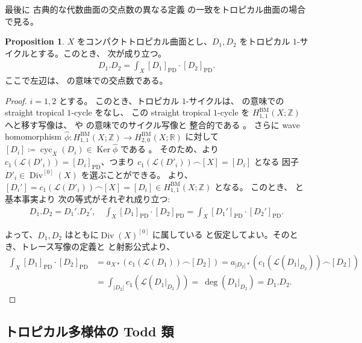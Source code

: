 \documentclass[a4paper,dvipdfmx,reqno,12pt]{amsart}
\theoremstyle{definition}
\newtheorem{proposition}[theorem]{Proposition}
\newcommand{\deq}{\coloneqq}
\newcommand{\opn}[1]{\operatorname{#1}}
\newcommand{\PD}[1]{[#1]_{\mathrm{PD}}}
\numberwithin{equation}{section}
\begin{document}
最後に
古典的な代数曲面の交点数の異なる定義
の一致をトロピカル曲面の場合で見る。
\begin{proposition}
\label{proposition-cycle-chern}
$X$ をコンパクトトロピカル曲面とし、$D_1,D_2$
をトロピカル $1$-サイクルとする。このとき、
次が成り立つ。
\begin{align}
D_1 . D_2=\int_X \PD{D_1}\cdot \PD{D_2}.
\end{align}
ここで左辺は、
\cite{shaw2015tropical,demedrano2023chern}
の意味での交点数である。
\end{proposition}
\begin{proof}
$i=1,2$ とする。
このとき、トロピカル $1$-サイクルは、
\cite[Definition 4.2]{MR3330789} の意味での
straight tropical $1$-cycle をなし、
この straight tropical $1$-cycle を
$H_{1,1}^{\mathrm{BM}}(X;\mathbb{Z})$
へと移す写像は、\cite{MR3894860} や
\cite{MR4637248} の意味でのサイクル写像と
整合的である \cite[Theorem 5.13]{MR4637248}。
さらに wave homomorphism 
$\hat{\phi}\colon 
H^{\mathrm{BM}}_{1,1}(X;\mathbb{Z})
\to H^{\mathrm{BM}}_{2,0}(X;\mathbb{R})$ に対して
$[D_i]\deq \opn{cyc}_X(D_i)\in \opn{Ker} \hat{\phi}$
である \cite[Theorem 5.4]{MR3330789}。
そのため、\cite[Lemma 5.13]{MR3894860}より
$c_1(\mathcal{L}(D'_i))=\PD{D_i}$、つまり
$c_1(\mathcal{L}(D'_i))\frown [X]=[D_i]$ となる
因子 $D'_i\in \opn{Div}^{[0]}(X)$ を選ぶことができる。
\cite[Proposition 5.12]{MR4637248}より、
$[D_i']=c_1(\mathcal{L}(D'_i))\frown [X]=[D_i]\in 
H_{1,1}^{\mathrm{BM}}(X;\mathbb{Z})$ 
となる。
このとき、
\cite[Proposition 3.34]{shaw2015tropical} と基本事実より
次の等式がそれぞれ成り立つ:
\begin{align}
D_1.D_2=D_1'.D_2', \quad 
\int_X \PD{D_1}\cdot \PD{D_2}
=\int_X \PD{D_1'}\cdot \PD{D_2'}.
\end{align}

よって、$D_1,D_2$ はともに$\opn{Div}(X)^{[0]}$ に属している
と仮定してよい。そのとき、トレース写像の定義と
\cite[Proposition 5.12]{MR4637248}と射影公式より、
\begin{align}
\int_X \PD{D_1}\cdot \PD{D_2}
&=a_{X*}(c_1(\mathcal{L}(D_1))\frown [D_2])
=a_{|D_2|*}(c_1(\mathcal{L}(D_1|_{D_2}))\frown [D_2]) \\
&=\int_{|D_2|}c_1(\mathcal{L}(D_1|_{D_2}))=\
\opn{deg}(D_1|_{D_2})=D_1.D_2.
\end{align}
\end{proof}


\subsection{トロピカル多様体の Todd 類}
\end{document}
